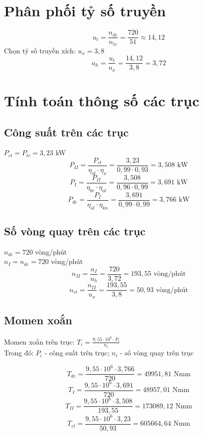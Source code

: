\documentclass[12pt,a4paper]{report}
\begin{document}
\section{Phân phối tỷ số truyền}
$$u_t = \frac{n_{dc}}{n_{lv}} = \frac{720}{51} \approx 14{,}12$$
Chọn tỷ số truyền xích: $u_x = 3{,}8$\\
$$u_h = \frac{u_t}{u_x} = \frac{14{,}12}{3{,}8} = 3{,}72$$

\section{Tính toán thông số các trục}

\subsection{Công suất trên các trục}
$P_{ct} = P_{lv} = 3{,}23$ kW
$$P_{II} = \frac{P_{ct}}{\eta_{ol} \cdot \eta_{x}} = \frac{3{,}23}{0{,}99 \cdot 0{,}93} = 3{,}508 \text{ kW}$$
$$P_{I} = \frac{P_{II}}{\eta_{br} \cdot \eta_{ol}} = \frac{3{,}508}{0{,}96 \cdot 0{,}99} = 3{,}691 \text{ kW}$$
$$P_{dc} = \frac{P_{I}}{\eta_{ol} \cdot \eta_{kn}} = \frac{3{,}691}{0{,}99 \cdot 0{,}99} = 3{,}766 \text{ kW}$$

\subsection{Số vòng quay trên các trục}
$n_{dc} = 720$ vòng/phút\\
$n_{I} = n_{dc} = 720$ vòng/phút
$$n_{II} = \frac{n_{I}}{u_h} = \frac{720}{3{,}72} = 193{,}55 \text{ vòng/phút}$$
$$n_{ct} = \frac{n_{II}}{u_x} = \frac{193{,}55}{3{,}8} = 50{,}93 \text{ vòng/phút}$$

\subsection{Momen xoắn}
Momen xoắn trên trục: $T_i = \frac{9{,}55 \cdot 10^6 \cdot P_i}{n_i}$\\
Trong đó: $P_i$ - công suất trên trục; $n_i$ - số vòng quay trên trục

$$T_{dc} = \frac{9{,}55 \cdot 10^6 \cdot 3{,}766}{720} = 49951{,}81 \text{ Nmm}$$
$$T_{I} = \frac{9{,}55 \cdot 10^6 \cdot 3{,}691}{720} = 48957{,}01 \text{ Nmm}$$
$$T_{II} = \frac{9{,}55 \cdot 10^6 \cdot 3{,}508}{193{,}55} = 173089{,}12 \text{ Nmm}$$
$$T_{ct} = \frac{9{,}55 \cdot 10^6 \cdot 3{,}23}{50{,}93} = 605664{,}64 \text{ Nmm}$$
\end{document}
